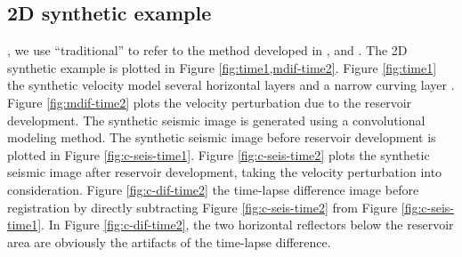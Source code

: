 \subsection{2D synthetic example}
, we use ``traditional''  to refer to the method developed in \cite{fomel20094}, and . The 2D synthetic example is plotted in Figure \ref{fig:time1,mdif-time2}. Figure \ref{fig:time1}  the synthetic velocity model several horizontal layers and a narrow curving layer  .  Figure  \ref{fig:mdif-time2} plots the velocity perturbation due to the reservoir development.  The synthetic seismic image is generated using a convolutional %
modeling method. The synthetic seismic image before reservoir development is plotted in Figure \ref{fig:c-seis-time1}. Figure \ref{fig:c-seis-time2} plots the synthetic seismic image after reservoir development, taking the velocity perturbation into consideration. Figure \ref{fig:c-dif-time2}  the time-lapse difference image before registration by directly subtracting Figure \ref{fig:c-seis-time2} from Figure \ref{fig:c-seis-time1}. In Figure \ref{fig:c-dif-time2}, the two horizontal reflectors below the reservoir area are obviously the artifacts of the time-lapse difference.

